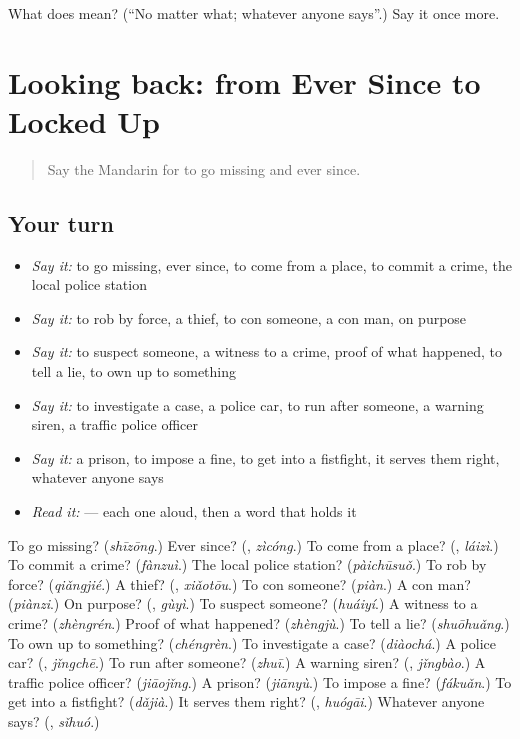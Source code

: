 \begin{tcolorbox}[breakable,colback=teal!4,colframe=teal!35!black,title={Before you move on}]
What does  mean? (\textquotedblleft{}No matter what; whatever anyone says\textquotedblright{}.) Say it once more.
\end{tcolorbox}
\section[(dialogue)]{Looking back: from Ever Since to Locked Up}

\label{lesson:ZH-R312-review-308-312}



\begin{quote}
Say the Mandarin for to go missing and ever since.
\end{quote}

\subsection*{Your turn}
\begin{itemize}
\raggedright
  \item \emph{Say it:} to go missing, ever since, to come from a place, to commit a crime, the local police station
  \item \emph{Say it:} to rob by force, a thief, to con someone, a con man, on purpose
  \item \emph{Say it:} to suspect someone, a witness to a crime, proof of what happened, to tell a lie, to own up to something
  \item \emph{Say it:} to investigate a case, a police car, to run after someone, a warning siren, a traffic police officer
  \item \emph{Say it:} a prison, to impose a fine, to get into a fistfight, it serves them right, whatever anyone says
  \item \emph{Read it:}    — each one aloud, then a word that holds it
\end{itemize}

\begin{tcolorbox}[breakable,colback=teal!4,colframe=teal!35!black,title={Before you move on}]
To go missing? (\emph{shīzōng}.) Ever since? (\textbf{}, \emph{zìcóng}.) To come from a place? (\textbf{}, \emph{láizì}.) To commit a crime? (\emph{fànzuì}.) The local police station? (\emph{pàichūsuǒ}.) To rob by force? (\emph{qiǎngjié}.) A thief? (\textbf{}, \emph{xiǎotōu}.) To con someone? (\emph{piàn}.) A con man? (\emph{piànzi}.) On purpose? (\textbf{}, \emph{gùyì}.) To suspect someone? (\emph{huáiyí}.) A witness to a crime? (\emph{zhèngrén}.) Proof of what happened? (\emph{zhèngjù}.) To tell a lie? (\emph{shuōhuǎng}.) To own up to something? (\emph{chéngrèn}.) To investigate a case? (\emph{diàochá}.) A police car? (\textbf{}, \emph{jǐngchē}.) To run after someone? (\emph{zhuī}.) A warning siren? (\textbf{}, \emph{jǐngbào}.) A traffic police officer? (\emph{jiāojǐng}.) A prison? (\emph{jiānyù}.) To impose a fine? (\emph{fákuǎn}.) To get into a fistfight? (\emph{dǎjià}.) It serves them right? (\textbf{}, \emph{huógāi}.) Whatever anyone says? (\textbf{}, \emph{sǐhuó}.)
\end{tcolorbox}
